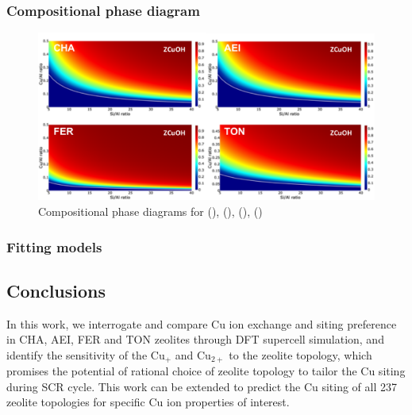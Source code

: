 \documentclass[12pt]{article}
\begin{document}
\subsubsection*{Compositional phase diagram}
\begin{figure}[H]
\centering
  \includegraphics[width=5.2in]{./Figures/Figure-5}
  \caption{Compositional phase diagrams for (), (), (), ()}
  \label{PhaseDiagram}
\end{figure}

\subsubsection*{Fitting models}

\subsection*{Conclusions}

In this work, we interrogate and compare Cu ion exchange and siting preference in CHA, AEI, FER and TON zeolites through DFT supercell simulation, and identify the sensitivity of the  Cu$_{+}$ and Cu$_{2+}$ to the zeolite topology, which promises the potential of rational choice of zeolite topology to tailor the Cu siting  during SCR cycle. This work can be extended to predict the Cu siting of all 237 zeolite topologies for specific Cu ion properties of interest. 



\end{document}
